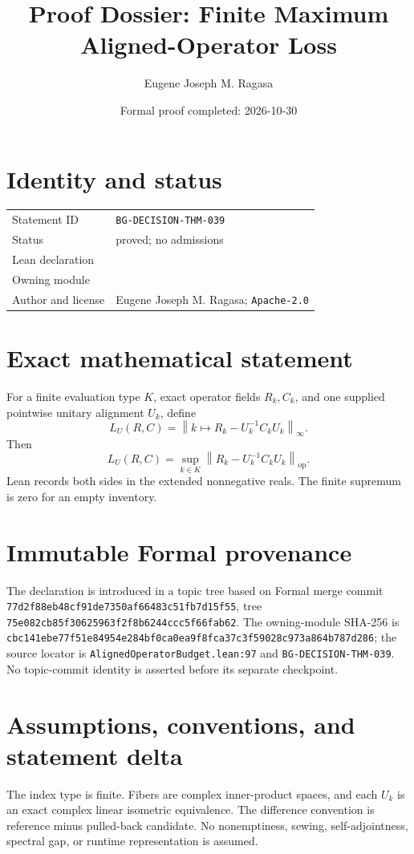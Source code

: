 \documentclass[11pt]{article}
\title{Proof Dossier: Finite Maximum Aligned-Operator Loss}
\author{Eugene Joseph M. Ragasa}
\date{Formal proof completed: 2026-10-30}
\begin{document}
\raggedright
\maketitle

\section{Identity and status}
\begin{tabularx}{\textwidth}{@{}lY@{}}
\toprule
Statement ID & \texttt{BG-DECISION-THM-039} \\
Status & proved; no admissions \\
Lean declaration &  \\
Owning module &  \\
Author and license & Eugene Joseph M. Ragasa; \texttt{Apache-2.0} \\
\bottomrule
\end{tabularx}

\section{Exact mathematical statement}
For a finite evaluation type $K$, exact operator fields $R_k,C_k$, and one supplied pointwise unitary alignment $U_k$, define
\[
 L_U(R,C)=\left\|k\mapsto R_k-U_k^{-1}C_kU_k\right\|_{\infty}.
\]
Then
\[
 L_U(R,C)=\sup_{k\in K}\left\|R_k-U_k^{-1}C_kU_k\right\|_{\mathrm{op}}.
\]
Lean records both sides in the extended nonnegative reals.  The finite supremum is zero for an empty inventory.

\section{Immutable Formal provenance}
The declaration is introduced in a topic tree based on Formal merge commit
\texttt{77d2f88eb48cf91de7350af66483c51fb7d15f55}, tree
\texttt{75e082cb85f30625963f2f8b6244ccc5f66fab62}.  The owning-module SHA-256 is
\texttt{cbc141ebe77f51e84954e284bf0ca0ea9f8fca37c3f59028c973a864b787d286}; the source locator is \texttt{AlignedOperatorBudget.lean:97} and \texttt{BG-DECISION-THM-039}.  No topic-commit identity is asserted before its separate checkpoint.

\section{Assumptions, conventions, and statement delta}
The index type is finite.  Fibers are complex inner-product spaces, and each $U_k$ is an exact complex linear isometric equivalence.  The difference convention is reference minus pulled-back candidate.  No nonemptiness, sewing, self-adjointness, spectral gap, or runtime representation is assumed.
\end{document}
